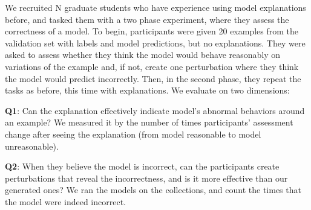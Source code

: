 We recruited N graduate students who have experience using model explanations before, and tasked them with a two phase experiment, where they assess the correctness of a \qqp model.
To begin, participants were given 20 \qqp examples from the validation set with labels and model predictions, but no explanations.
They were asked to assess whether they think the model would behave reasonably on variations of the example and, if not, create one perturbation where they think the model would predict incorrectly.
Then, in the second phase, they repeat the tasks as before, this time with explanations.
We evaluate on two dimensions:

\textbf{Q1}: 
Can the explanation effectively indicate model's abnormal behaviors around an example? 
We measured it by the number of times participants' assessment change after seeing the explanation (\eg from model reasonable to model unreasonable).

\textbf{Q2}: 
When they believe the model is incorrect, can the participants create perturbations that reveal the incorrectness, and is it more effective than our generated ones?
We ran the models on the collections, and count the times that the model were indeed incorrect.



\begin{comment}
****
The examples generated by BERT.
****

  P: The quarterback of the UTEP football team is about to be tackled by a member of the Wisconsin defensive team.
  H: The quarterback is about to be tackled by the opposing team.
 Pr: entailment
 NP: Another quarterback is about to be tackled by the opposing team.
NPr: neutral
weight:  0.122
flip_unimportant_feature 0.013 {The}

  P: The quarterback of the UTEP football team is about to be tackled by a member of the Wisconsin defensive team.
  H: The quarterback is about to be tackled by the opposing team.
 Pr: entailment
 NP: Jack is about to be tackled by the opposing team.
NPr: neutral
weight:  0.461
flip_unimportant_feature 0.028 {The, quarterback}


  P: The quarterback of the UTEP football team is about to be tackled by a member of the Wisconsin defensive team.
  H: The quarterback is about to be tackled by the opposing team.
 Pr: entailment
 NP: The quarterback is about to be tackled by someone
NPr: entailment
weight:  0.218
unflip_important_feature 0.3 {team, the, ., opposing}

  P: The quarterback of the UTEP football team is about to be tackled by a member of the Wisconsin defensive team.
  H: The quarterback is about to be tackled by the opposing team.
 Pr: entailment
 NP: The quarterback is about to be tackled by the second team.
NPr: entailment
weight:  0.292
unflip_important_feature 0.149 {opposing}


\end{comment}


